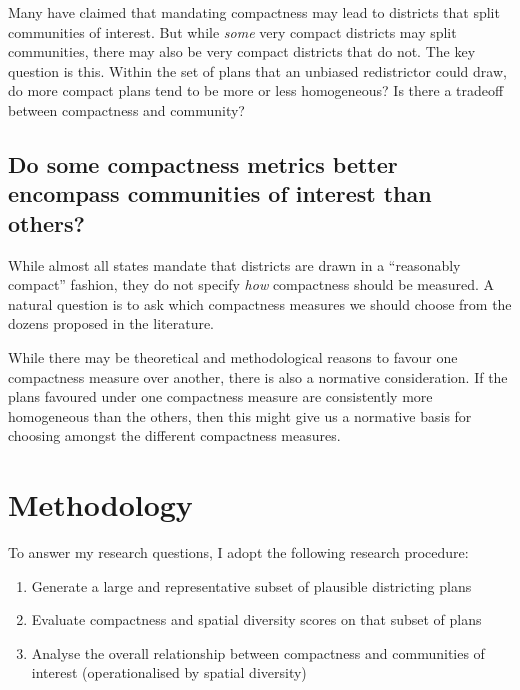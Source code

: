 \documentclass[]{article}
\providecommand{\tightlist}{%
  \setlength{\itemsep}{0pt}\setlength{\parskip}{0pt}}
\begin{document}
Many have claimed that mandating compactness may lead to districts that
split communities of interest. But while \emph{some} very compact
districts may split communities, there may also be very compact
districts that do not. The key question is this. Within the set of plans
that an unbiased redistrictor could draw, do more compact plans tend to
be more or less homogeneous? Is there a tradeoff between compactness and
community?

\hypertarget{do-some-compactness-metrics-better-encompass-communities-of-interest-than-others}{%
\subsection{Do some compactness metrics better encompass communities of
interest than
others?}\label{do-some-compactness-metrics-better-encompass-communities-of-interest-than-others}}

While almost all states mandate that districts are drawn in a
``reasonably compact'' fashion, they do not specify \emph{how}
compactness should be measured. A natural question is to ask which
compactness measures we should choose from the dozens proposed in the
literature.

While there may be theoretical and methodological reasons to favour one
compactness measure over another, there is also a normative
consideration. If the plans favoured under one compactness measure are
consistently more homogeneous than the others, then this might give us a
normative basis for choosing amongst the different compactness measures.

\hypertarget{methodology}{%
\section{Methodology}\label{methodology}}

To answer my research questions, I adopt the following research
procedure:

\begin{enumerate}
\def\labelenumi{\arabic{enumi}.}
\tightlist
\item
  Generate a large and representative subset of plausible districting
  plans
\item
  Evaluate compactness and spatial diversity scores on that subset of
  plans
\item
  Analyse the overall relationship between compactness and communities
  of interest (operationalised by spatial diversity)
\end{enumerate}
\end{document}
